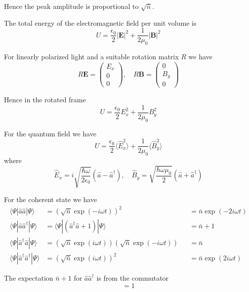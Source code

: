 \documentclass[12pt]{article}
\begin{document}
Hence the peak amplitude is proportional to $\sqrt{\bar n}$.

\bigskip
The total energy of the electromagnetic field per unit volume is
\begin{equation*}
U=\frac{\epsilon_0}{2}|\mathbf E|^2+\frac{1}{2\mu_0}|\mathbf B|^2
\end{equation*}

For linearly polarized light and a suitable rotation matrix $R$ we have
\begin{equation*}
R\mathbf E=\begin{pmatrix}E_x\\0\\0\end{pmatrix},
\quad
R\mathbf B=\begin{pmatrix}0\\B_y\\0\end{pmatrix}
\end{equation*}

Hence in the rotated frame
\begin{equation*}
U=\frac{\epsilon_0}{2}E_x^2+\frac{1}{2\mu_0}B_y^2
\end{equation*}

For the quantum field we have
\begin{equation*}
U=\frac{\epsilon_0}{2}\langle\hat E_x^2\rangle+\frac{1}{2\mu_0}\langle\hat B_y^2\rangle
\end{equation*}
where
\begin{equation*}
\hat E_x=i\sqrt{\frac{\hbar\omega}{2\epsilon_0}}(\hat a-\hat a^\dag),
\quad
\hat B_y=\sqrt{\frac{\hbar\omega\mu_0}{2}}(\hat a+\hat a^\dag)
\end{equation*}

For the coherent state we have
\begin{align*}
\langle\Psi|\hat a\hat a|\Psi\rangle&=\left(\sqrt{\bar n}\exp(-i\omega t)\right)^2
& &=\bar n\exp(-2i\omega t)
\\
\langle\Psi|\hat a\hat a^\dag|\Psi\rangle&=\langle\Psi|(\hat a^\dag\hat a+1)|\Psi\rangle
& &=\bar n+1
\\
\langle\Psi|\hat a^\dag\hat a|\Psi\rangle
&=\left(\sqrt{\bar n}\exp(i\omega t)\right)\left(\sqrt{\bar n}\exp(-i\omega t)\right)
& &=\bar n
\\
\langle\Psi|\hat a^\dag\hat a^\dag|\Psi\rangle&=\left(\sqrt{\bar n}\exp(i\omega t)\right)^2
& &=\bar n\exp(2i\omega t)
\end{align*}

The expectation $\bar n+1$ for $\hat a\hat a^\dag$ is from the commutator
\begin{equation*}
[\hat a,\hat a^\dag]=1
\end{equation*}
\end{document}
